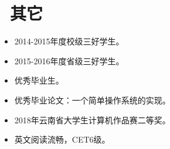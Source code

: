 \documentclass{resume}
\begin{document}
\section{\faInfo\ 其它}
\begin{itemize}[parsep=0.5ex]
  \item 2014-2015年度校级三好学生。
  \item 2015-2016年度省级三好学生。
  \item 优秀毕业生。
  \item 优秀毕业论文：一个简单操作系统的实现。
  \item 2018年云南省大学生计算机作品赛二等奖。
  \item 英文阅读流畅，CET6级。
\end{itemize}

%
%
\end{document}
